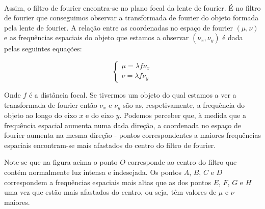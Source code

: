\documentclass{article}
\renewcommand{\familydefault}{\sfdefault}
\begin{document}
\begin{multicols}{2}
\paragraph{}
Assim, o filtro de fourier encontra-se no plano focal da lente de fourier. É no filtro de fourier que conseguimos observar a transformada de fourier do objeto formada pela lente de fourier.
A relação entre as coordenadas no espaço de fourier $(\mu, \nu)$ e as frequências espaciais do objeto que estamos a observar $(\nu_x, \nu_y)$ é dada pelas seguintes equações:

\[ \renewcommand*\familydefault{\sfdefault}
  \begin{cases}
  \mu = \lambda f \nu_x \\
  \nu = \lambda f \nu_y
\end{cases} \]

Onde $f$ é a distância focal. 
Se tivermos um objeto do qual estamos a ver a transformada de fourier então $\nu_x$ e $\nu_y$ são as, respetivamente, a frequência do objeto ao longo do eixo $x$ e do eixo $y$.
Podemos perceber que, à medida que a frequência espacial aumenta numa dada direção, a coordenada no espaço de fourier aumenta na mesma direção - pontos correspondentes a maiores frequências espaciais encontram-se mais afastados do centro do filtro de fourier.

\begin{center}
  
    
\end{center}

Note-se que na figura acima o ponto $O$ corresponde ao centro do filtro que contém normalmente luz intensa e indesejada.
Os pontos $A$, $B$, $C$ e $D$ correspondem a frequências espaciais mais altas que as dos pontos $E$, $F$, $G$ e $H$ uma vez que estão mais afastados do centro, ou seja, têm valores de $\mu$ e $\nu$ maiores. 


\end{multicols}
\end{document}

